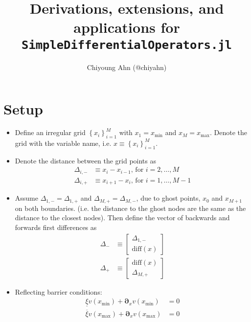 \documentclass[11pt]{article}
\newcommand{\D}[1][]{\ensuremath{\boldsymbol{\partial}_{#1}}}
\newcommand{\set}[1]{\ensuremath{\left\{{#1}\right\}}}
\begin{document}
\title{Derivations, extensions, and applications for \texttt{SimpleDifferentialOperators.jl}}
\author{Chiyoung Ahn (@chiyahn)}
\maketitle

\section{Setup}

\begin{itemize}
	\item Define an irregular grid $\set{x_i}_{i=1}^M$ with $x_1 = {x_{\min}}$ and $x_{M} = {x_{\max}}$. Denote the grid with the variable name, i.e. $x \equiv \set{x_i}_{i=1}^M$.
	\item Denote the distance between the grid points as
	\begin{align}
	\Delta_{i,-} &\equiv x_i - x_{i-1},\, \text{for } i = 2,\ldots, M\\
	\Delta_{i,+} &\equiv x_{i+1} - x_i,\, \text{for } i = 1,\ldots, M-1
	\end{align}
	
	\item Assume $\Delta_{1, -} = \Delta_{1, +}$ and $\Delta_{M, +} = \Delta_{M, -}$, due to ghost points, $x_0$ and $x_{M+1}$ on both boundaries. (i.e. the distance to the ghost nodes are the same as the distance to the closest nodes).  Then define the vector of backwards and forwards first differences as
	\begin{align}
	\Delta_{-} &\equiv \begin{bmatrix} \Delta_{1,-} \\
	\text{diff}(x)
	\end{bmatrix}\\
	\Delta_{+} &\equiv \begin{bmatrix} \text{diff}(x)\\
	\Delta_{M,+}
	\end{bmatrix}
	\end{align}
	\item Reflecting barrier conditions:
	\begin{align}
	\underline{\xi} v({x_{\min}}) + \D[x]v({x_{\min}} ) &= 0\label{eq:new-BC1}\\
	\overline{\xi} v({x_{\max}}) + \D[x]v({x_{\max}}) &= 0\label{eq:new-BC2}
	\end{align}
\end{itemize}
\end{document}
